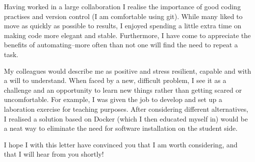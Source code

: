 \documentclass[11pt, a4paper]{../awesome-cv} %
\begin{document}
\begin{cvletter}
Having worked in a large collaboration I realise the importance of good coding practises and version control (I am comfortable using git).
While many liked to move as quickly as possible to results, I enjoyed spending a little extra time on making code more elegant and stable.
Furthermore, I have come to appreciate the benefits of automating–more often than not one will find the need to repeat a task.

My colleagues would describe me as positive and stress resilient, capable and with a will to understand.
When faced by a new, difficult problem, I see it as a challenge and an opportunity to learn new things rather than getting scared or uncomfortable. 
For example, I was given the job to develop and set up a laboration exercise for teaching purposes. 
After considering different alternatives, I realised a solution based on Docker (which I then educated myself in) would be a neat way to eliminate the need for software installation on the student side.

I hope I with this letter have convinced you that I am worth considering, and that I will hear from you shortly!

\end{cvletter}


\makeletterclosing %
\end{document}
